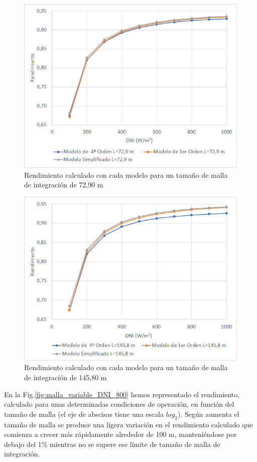 \begin{figure}[H]
\includegraphics[width=0.87\linewidth]{images/malla7290.png}
\caption{Rendimiento calculado con cada modelo para un tamaño de malla de integración de 72,90 m} 
\label{fig:malla7290}
\end{figure}

\begin{figure}[H]
\includegraphics[width=0.87\linewidth]{images/malla14580.png}
\caption{Rendimiento calculado con cada modelo para un tamaño de malla de integración de 145,80 m} 
\label{fig:malla14580}
\end{figure}

En la Fig.\ref{fig:malla_variable_DNI_800} hemos representado el rendimiento, calculado para unas determinadas condiciones de operación, en función del tamaño de malla (el eje de abscisas tiene una escala $log_2$). Según aumenta el tamaño de malla se produce una ligera variación en el rendimiento calculado que comienza a crecer más rápidamente alrededor de 100 m, manteniéndose por debajo del 1\% mientras no se supere ese límite de tamaño de malla de integración. 

